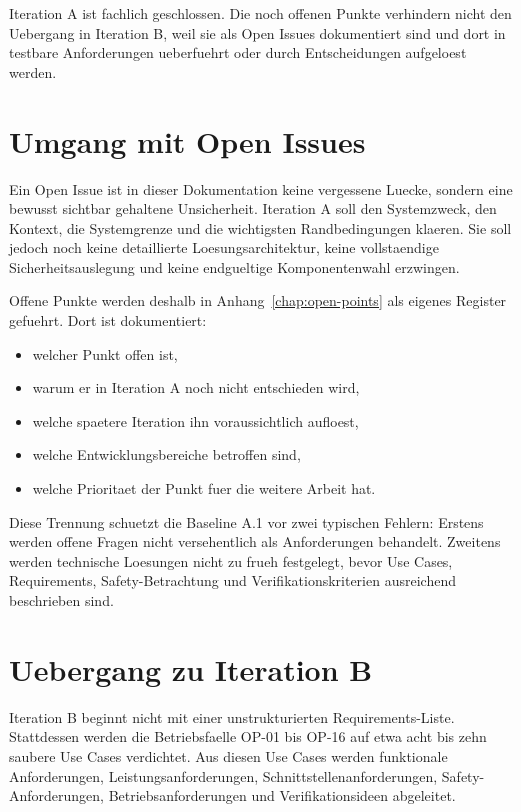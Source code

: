Iteration A ist fachlich geschlossen. Die noch offenen Punkte verhindern nicht den Uebergang in Iteration B, weil sie als Open Issues dokumentiert sind und dort in testbare Anforderungen ueberfuehrt oder durch Entscheidungen aufgeloest werden.

\section{Umgang mit Open Issues}

Ein Open Issue ist in dieser Dokumentation keine vergessene Luecke, sondern eine bewusst sichtbar gehaltene Unsicherheit. Iteration A soll den Systemzweck, den Kontext, die Systemgrenze und die wichtigsten Randbedingungen klaeren. Sie soll jedoch noch keine detaillierte Loesungsarchitektur, keine vollstaendige Sicherheitsauslegung und keine endgueltige Komponentenwahl erzwingen.

Offene Punkte werden deshalb in Anhang~\ref{chap:open-points} als eigenes Register gefuehrt. Dort ist dokumentiert:
\begin{itemize}
  \item welcher Punkt offen ist,
  \item warum er in Iteration A noch nicht entschieden wird,
  \item welche spaetere Iteration ihn voraussichtlich aufloest,
  \item welche Entwicklungsbereiche betroffen sind,
  \item welche Prioritaet der Punkt fuer die weitere Arbeit hat.
\end{itemize}

Diese Trennung schuetzt die Baseline A.1 vor zwei typischen Fehlern: Erstens werden offene Fragen nicht versehentlich als Anforderungen behandelt. Zweitens werden technische Loesungen nicht zu frueh festgelegt, bevor Use Cases, Requirements, Safety-Betrachtung und Verifikationskriterien ausreichend beschrieben sind.

\section{Uebergang zu Iteration B}

Iteration B beginnt nicht mit einer unstrukturierten Requirements-Liste. Stattdessen werden die Betriebsfaelle OP-01 bis OP-16 auf etwa acht bis zehn saubere Use Cases verdichtet. Aus diesen Use Cases werden funktionale Anforderungen, Leistungsanforderungen, Schnittstellenanforderungen, Safety-Anforderungen, Betriebsanforderungen und Verifikationsideen abgeleitet.

